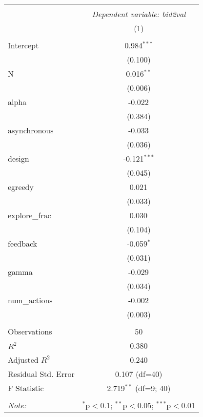 \begin{table}[!htbp] \centering
\begin{tabular}{@{\extracolsep{5pt}}lc}
\\[-1.8ex]\hline
\hline \\[-1.8ex]
& \multicolumn{1}{c}{\textit{Dependent variable: bid2val}} \
\cr \cline{2-2}
\\[-1.8ex] & (1) \\
\hline \\[-1.8ex]
 Intercept & 0.984$^{***}$ \\
& (0.100) \\
 N & 0.016$^{**}$ \\
& (0.006) \\
 alpha & -0.022$^{}$ \\
& (0.384) \\
 asynchronous & -0.033$^{}$ \\
& (0.036) \\
 design & -0.121$^{***}$ \\
& (0.045) \\
 egreedy & 0.021$^{}$ \\
& (0.033) \\
 explore_frac & 0.030$^{}$ \\
& (0.104) \\
 feedback & -0.059$^{*}$ \\
& (0.031) \\
 gamma & -0.029$^{}$ \\
& (0.034) \\
 num_actions & -0.002$^{}$ \\
& (0.003) \\
\hline \\[-1.8ex]
 Observations & 50 \\
 $R^2$ & 0.380 \\
 Adjusted $R^2$ & 0.240 \\
 Residual Std. Error & 0.107 (df=40) \\
 F Statistic & 2.719$^{**}$ (df=9; 40) \\
\hline
\hline \\[-1.8ex]
\textit{Note:} & \multicolumn{1}{r}{$^{*}$p$<$0.1; $^{**}$p$<$0.05; $^{***}$p$<$0.01} \\
\end{tabular}
\end{table}